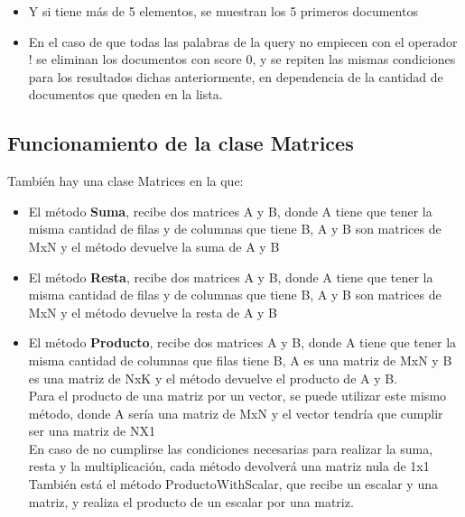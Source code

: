\documentclass[12pt, a4paper]{article}
\begin{document}
\begin{enumerate}
\begin{itemize}
                  \item Y si tiene más de 5 elementos, se muestran los 5 primeros documentos
            
                  \item En el caso de que todas las palabras de la query no empiecen con el operador !
                  se eliminan los documentos con score 0, y se repiten las mismas condiciones
                  para los resultados dichas anteriormente, en dependencia de la cantidad de
                  documentos que queden en la lista.
            \end{itemize}
 
            
      \end{enumerate}
            
            \subsection{Funcionamiento de la clase Matrices}
            También hay una clase Matrices en la que:

            \begin{itemize}
                  \item El método \textbf{Suma}, recibe dos matrices A y B, donde A tiene que tener
                        la misma cantidad de filas y de columnas que tiene B, A y B son matrices de MxN
                        y el método devuelve la suma de A y B

                  \item El método \textbf{Resta}, recibe dos matrices A y B, donde A tiene que tener la
                        misma cantidad de filas y de columnas que tiene B, A y B son matrices de MxN y
                        el método devuelve la resta de A y B

                  \item El método \textbf{Producto}, recibe dos matrices A y B, donde A tiene que tener la misma
                        cantidad de columnas que filas tiene B, A es una matriz de MxN y B es una matriz
                        de NxK y el método devuelve el producto de A y B.\\
                        Para el producto de una matriz por un vector, se puede utilizar este mismo método,
                        donde A sería una matriz de MxN y el vector tendría que cumplir ser una matriz
                        de NX1\\
                        En caso de no cumplirse las condiciones necesarias para realizar la suma, resta y
                        la multiplicación, cada método devolverá una matriz nula de 1x1\\
                        También está el método ProductoWithScalar,
                        que recibe un escalar y una matriz, y realiza el producto de un escalar por una
                        matriz.

            \end{itemize}
\end{document}
